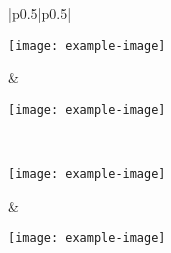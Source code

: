 \documentclass[8pt]{article}
\begin{document}
\clearpage
\renewcommand{\arraystretch}{0}
\setlength{\tabcolsep}{0pt}

\noindent
\begin{tabular}{|p{0.5\textwidth}|p{0.5\textwidth}|}
\hline
\begin{minipage}[c][0.33\textheight][c]{\linewidth}
\centering
\texttt{[image: example-image]}
\label{fig:7}
\end{minipage}
&
\begin{minipage}[c][0.33\textheight][c]{\linewidth}
\centering
\texttt{[image: example-image]}
\captionsetup{labelformat=empty}
\label{fig:S1}
\end{minipage}
\\ \hline
\begin{minipage}[c][0.33\textheight][c]{\linewidth}
\centering
\texttt{[image: example-image]}
\captionsetup{labelformat=empty}
\label{fig:S2}
\end{minipage}
&
\begin{minipage}[c][0.33\textheight][c]{\linewidth}
\centering
\texttt{[image: example-image]}
\captionsetup{labelformat=empty}
\label{fig:S3}
\end{minipage}
\\ \hline
\end{tabular}
\end{document}
